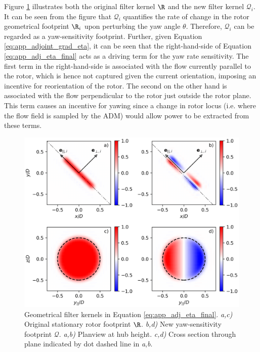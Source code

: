 Figure \ref{fig:filters} illustrates both the original filter kernel $\R$ and the new filter kernel $\mathscr{Q}_i$. It can be seen from the figure that $\mathscr{Q}_i$ quantifies the rate of change in the rotor geometrical footprint $\R_i$ upon perturbing the yaw angle $\theta$. Therefore, $\mathscr{Q}_i$ can be regarded as a yaw-sensitivity footprint.
Further, given Equation \eqref{eq:app_adjoint_grad_eta}, it can be seen that the right-hand-side of Equation \eqref{eq:app_adj_eta_final} acts as a driving term for the yaw rate sensitivity. The first term in the right-hand-side is associated with the flow currently parallel to the rotor, which is hence not captured given the current orientation, imposing an incentive for reorientation of the rotor. The second on the other hand is associated with the flow perpendicular to the rotor just outside the rotor plane. This term causes an incentive for yawing since a change in rotor locus (i.e. where the flow field is sampled by the ADM) would allow power to be extracted from these terms. 

\begin{figure}
	\includegraphics[width=\textwidth]{chapters/appendix_adjoint_derivation/R_Qpng.eps}
	\caption[Illustration of geometrical filter kernels in Equation \eqref{eq:app_adj_eta_final}.]{Geometrical filter kernels in Equation \eqref{eq:app_adj_eta_final}. \emph{a,c)} Original stationary rotor footprint $\R$. \emph{b,d)} New yaw-sensitivity footprint $\mathscr{Q}$. \emph{a,b)} Planview at hub height. \emph{c,d)} Cross section through plane indicated by dot dashed line in \emph{a},\emph{b}. \label{fig:filters}}
\end{figure}

\cleardoublepage